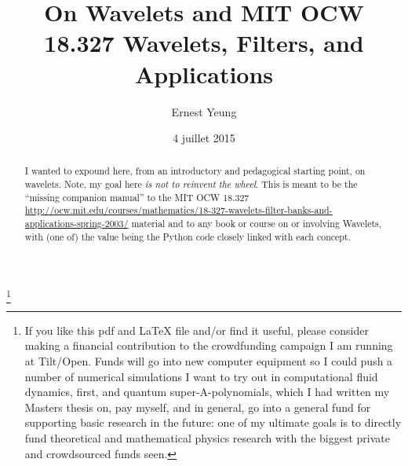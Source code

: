 \documentclass[twoside]{amsart}
\theoremstyle{plain}
\theoremstyle{definition}
\theoremstyle{remark}
\numberwithin{equation}{section}
\begin{document}
\title[Wavelets]{On Wavelets and MIT OCW 18.327 Wavelets, Filters, and Applications}
\author{Ernest Yeung}
\address{}
\thanks{If you like this pdf and LaTeX file and/or find it useful, please consider making a financial contribution to the crowdfunding campaign I am running at Tilt/Open.  Funds will go into new computer equipment so I could push a number of numerical simulations I want to try out in computational fluid dynamics, first, and quantum super-A-polynomials, which I had written my Masters thesis on, pay myself, and in general, go into a general fund for supporting basic research in the future: one of my ultimate goals is to directly fund theoretical and mathematical physics research with the biggest private and crowdsourced funds seen. }






\date{4 juillet 2015}
\begin{abstract}
I wanted to expound here, from an introductory and pedagogical starting point, on wavelets.  Note, my goal here \emph{is not to reinvent the wheel}.  This is meant to be the ``missing companion manual'' to the MIT OCW 18.327 \url{http://ocw.mit.edu/courses/mathematics/18-327-wavelets-filter-banks-and-applications-spring-2003/} material and to any book or course on or involving Wavelets, with (one of) the value being the Python code closely linked with each concept.  
\end{abstract}
\end{document}
